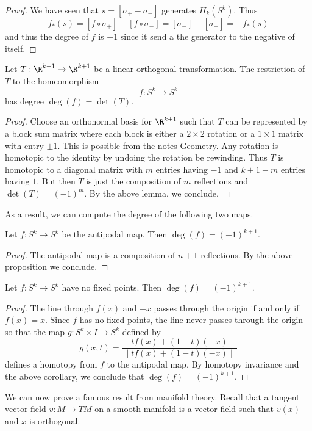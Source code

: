 \documentclass[a4paper]{article}
\begin{document}
\begin{lmm}{}{}
\begin{proof}
We have seen that $s=[\sigma_+-\sigma_-]$ generates $H_k(S^k)$. Thus $$f_\ast(s)=[f\circ\sigma_+]-[f\circ\sigma_-]=[\sigma_-]-[\sigma_+]=-f_\ast(s)$$ and thus the degree of $f$ is $-1$ since it send a the generator to the negative of itself. 
\end{proof}
\end{lmm}

\begin{prp}{}{} Let $T:\R^{k+1}\to\R^{k+1}$ be a linear orthogonal transformation. The restriction of $T$ to the homeomorphism $$f:S^k\to S^k$$ has degree $\deg(f)=\det(T)$. 
\begin{proof}
Choose an orthonormal basis for $\R^{k+1}$ such that $T$ can be represented by a block sum matrix where each block is either a $2\times 2$ rotation or a $1\times 1$ matrix with entry $\pm 1$. This is possible from the notes Geometry. Any rotation is homotopic to the identity by undoing the rotation be rewinding. Thus $T$ is homotopic to a diagonal matrix with $m$ entries having $-1$ and $k+1-m$ entries having $1$. But then $T$ is just the composition of $m$ reflections and $\det(T)=(-1)^m$. By the above lemma, we conclude. 
\end{proof}
\end{prp}

As a result, we can compute the degree of the following two maps. 

\begin{crl}{}{} Let $f:S^k\to S^k$ be the antipodal map. Then $\deg(f)=(-1)^{k+1}$. 
\begin{proof}
The antipodal map is a composition of $n+1$ reflections. By the above proposition we conclude. 
\end{proof}
\end{crl}

\begin{crl}{}{} Let $f:S^k\to S^k$ have no fixed points. Then $\deg(f)=(-1)^{k+1}$. 
\begin{proof}
The line through $f(x)$ and $-x$ passes through the origin if and only if $f(x)=x$. Since $f$ has no fixed points, the line never passes through the origin so that the map $g:S^k\times I\to S^k$ defined by $$g(x,t)=\frac{tf(x)+(1-t)(-x)}{\|tf(x)+(1-t)(-x)\|}$$ defines a homotopy from $f$ to the antipodal map. By homotopy invariance and the above corollary, we conclude that $\deg(f)=(-1)^{k+1}$. 
\end{proof}
\end{crl}

We can now prove a famous result from manifold theory. Recall that a tangent vector field $v:M\to TM$ on a smooth manifold is a vector field such that $v(x)$ and $x$ is orthogonal. 
\end{document}
